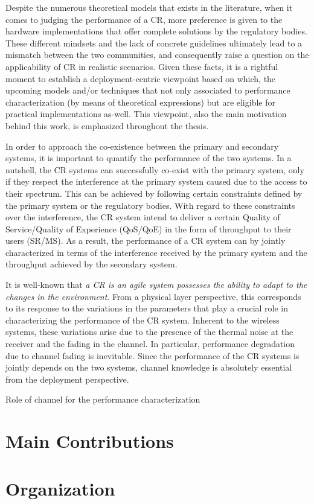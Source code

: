 Despite the numerous theoretical models that exists in the literature, when it comes to judging the performance of a CR, more preference is given to the hardware implementations that offer complete solutions by the regulatory bodies. These different mindsets and the lack of concrete guidelines ultimately lead to a mismatch between the two communities, and consequently raise a question on the applicability of CR in realistic scenarios. Given these facts, it is a rightful moment to establish a deployment-centric viewpoint based on which, the upcoming models and/or techniques that not only associated to performance characterization (by means of theoretical expressions) but are eligible for practical implementations as-well. This viewpoint, also the main motivation behind this work, is emphasized throughout the thesis. 

In order to approach the co-existence between the primary and secondary systems, it is important to quantify the performance of the two systems. In a nutshell, the CR systems can successfully co-exist with the primary system, only if they respect the interference at the primary system caused due to the access to their spectrum. This can be achieved by following certain constraints defined by the primary system or the regulatory bodies. With regard to these constraints over the interference, the CR system intend to deliver a certain Quality of Service/Quality of Experience (QoS/QoE) in the form of throughput to their users (SR/MS). As a result, the performance of a CR system can by jointly characterized in terms of the interference received by the primary system and the throughput achieved by the secondary system. 

It is well-known that \textit{a CR is an agile system possesses the ability to adapt to the changes in the environment}. From a physical layer perspective, this corresponds to its response to the variations in the parameters that play a crucial role in characterizing the performance of the CR system. Inherent to the wireless systems, these variations arise due to the presence of the thermal noise at the receiver and the fading in the channel. In particular, performance degradation due to channel fading is inevitable. Since the performance of the CR systems is jointly depends on the two systems, channel knowledge is absolutely essential from the deployment perspective. 

Role of channel for the performance characterization  

\section{Main Contributions}

\section{Organization}
